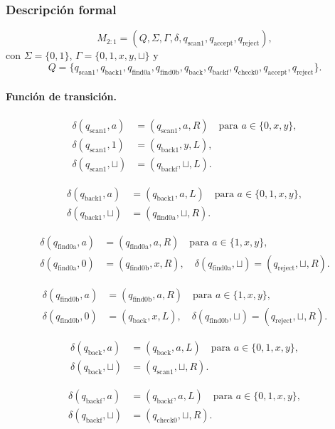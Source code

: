 \documentclass[11pt,a4paper]{article}
\theoremstyle{plain}
\theoremstyle{definition}
\theoremstyle{remark}
\newcommand{\qaccept}{q_{\text{accept}}}
\newcommand{\qreject}{q_{\text{reject}}}
\newcommand{\qback}{q_{\text{back}}}
\newcommand{\qscanone}{q_{\text{scan1}}}
\newcommand{\qbackone}{q_{\text{back1}}}
\newcommand{\qfindzeroa}{q_{\text{find0a}}}
\newcommand{\qfindzerob}{q_{\text{find0b}}}
\newcommand{\qbackf}{q_{\text{backf}}}
\newcommand{\qcheckzero}{q_{\text{check0}}}
\newcommand{\blank}{\sqcup}
\begin{document}
\subsubsection*{Descripci\'on formal}

\[
  M_{2{:}1} = (Q, \Sigma, \Gamma, \delta, \qscanone, \qaccept, \qreject),
\]
con $\Sigma=\{0,1\}$, $\Gamma=\{0,1,x,y,\blank\}$ y
\[
  Q = \{\qscanone, \qbackone, \qfindzeroa, \qfindzerob, \qback, \qbackf,
        \qcheckzero, \qaccept, \qreject\}.
\]

\paragraph{Funci\'on de transici\'on.}

\begin{align*}
\delta(\qscanone,a) &= (\qscanone,a,R) \quad \text{para } a\in\{0,x,y\},\\
\delta(\qscanone,1) &= (\qbackone,y,L),\\
\delta(\qscanone,\blank) &= (\qbackf,\blank,L).
\end{align*}

\begin{align*}
\delta(\qbackone,a) &= (\qbackone,a,L) \quad \text{para } a\in\{0,1,x,y\},\\
\delta(\qbackone,\blank) &= (\qfindzeroa,\blank,R).
\end{align*}

\begin{align*}
\delta(\qfindzeroa,a) &= (\qfindzeroa,a,R) \quad \text{para } a\in\{1,x,y\},\\
\delta(\qfindzeroa,0) &= (\qfindzerob,x,R),\quad
\delta(\qfindzeroa,\blank) = (\qreject,\blank,R).
\end{align*}

\begin{align*}
\delta(\qfindzerob,a) &= (\qfindzerob,a,R) \quad \text{para } a\in\{1,x,y\},\\
\delta(\qfindzerob,0) &= (\qback,x,L),\quad
\delta(\qfindzerob,\blank) = (\qreject,\blank,R).
\end{align*}

\begin{align*}
\delta(\qback,a) &= (\qback,a,L) \quad \text{para } a\in\{0,1,x,y\},\\
\delta(\qback,\blank) &= (\qscanone,\blank,R).
\end{align*}

\begin{align*}
\delta(\qbackf,a) &= (\qbackf,a,L) \quad \text{para } a\in\{0,1,x,y\},\\
\delta(\qbackf,\blank) &= (\qcheckzero,\blank,R).
\end{align*}
\end{document}
